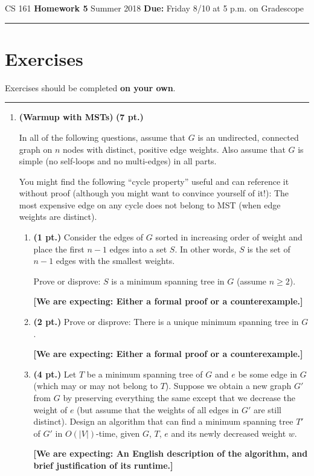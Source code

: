 \documentclass{article}
\begin{document}
\noindent
CS 161 \hfill \textbf{Homework 5} \newline 
Summer 2018 \hfill \textbf{Due:} Friday 8/10 at 5 p.m. on Gradescope

\noindent\rule{\linewidth}{0.4pt}

\section*{Exercises}

Exercises should be completed \textbf{on your own}.

\noindent\rule{\linewidth}{1.0pt}

\begin{enumerate}
  \item \textbf{(Warmup with MSTs)} \textbf{(7 pt.)}

    In all of the following questions, assume that $G$ is an undirected,
    connected graph on $n$ nodes with distinct, positive edge weights. Also
    assume that $G$ is simple (no self-loops and no multi-edges) in all parts.

    You might find the following ``cycle property'' useful and can reference it
    without proof (although you might want to convince yourself of it!): The
    most expensive edge on any cycle does not belong to MST (when edge weights
    are distinct).
    
    \begin{enumerate}
      \item \textbf{(1 pt.)} Consider the edges of $G$ sorted in increasing
        order of weight and place the first $n-1$ edges into a set $S$. In
        other words, $S$ is the set of $n-1$ edges with the smallest weights.
    
        Prove or disprove: $S$ is a minimum spanning tree in $G$ (assume
        $n \geq 2$).
    
        \textbf{[We are expecting: Either a formal proof or a counterexample.]}
    \item \textbf{(2 pt.)} Prove or disprove: There is a unique minimum
      spanning tree in $G$.
    
        \textbf{[We are expecting: Either a formal proof or a counterexample.]}
    \item \textbf{(4 pt.)} Let $T$ be a minimum spanning tree of $G$ and $e$
      be some edge in $G$ (which may or may not belong to $T$). Suppose we
      obtain a new graph $G'$ from $G$ by preserving everything the same except
      that we decrease the weight of $e$ (but assume that the weights of all
      edges in $G'$ are still distinct). Design an algorithm that can find a
      minimum spanning tree $T'$ of $G'$ in $O(|V|)$-time, given $G$, $T$, $e$
      and its newly decreased weight $w$.
    
      \textbf{[We are expecting: An English description of the algorithm, and
      brief justification of its runtime.]}
    \end{enumerate}
\end{enumerate}
\end{document}
